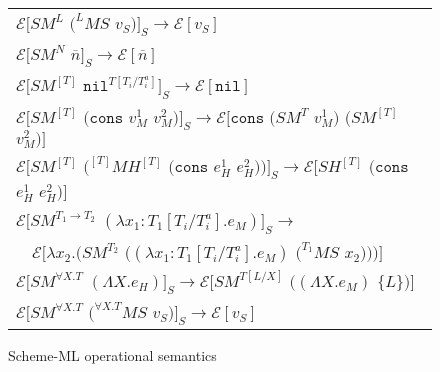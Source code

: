 \begin{figure}[p]
\centering
\begin{tabular}{l}
\vspace{5pt}

$\mathscr{E}[SM^{L}$ $(^{L}MS$ $v_{S})]_{S}\rightarrow\mathscr{E}[v_{S}]$ \\

\vspace{5pt}

$\mathscr{E}[SM^{N}$ $\overline{n}]_{S}\rightarrow\mathscr{E}[\overline{n}]$ \\

\vspace{5pt}

$\mathscr{E}[SM^{[T]}$ $\mathtt{nil}^{T[T_{i}/T_{i}^{a}]}]_{S}\rightarrow\mathscr{E}[\mathtt{nil}]$ \\

\vspace{5pt}

$\mathscr{E}[SM^{[T]}$ $(\mathtt{cons}$ $v_{M}^{1}$ $v_{M}^{2})]_{S}\rightarrow\mathscr{E}[\mathtt{cons}$ $(SM^{T}$ $v_{M}^{1})$ $(SM^{[T]}$ $v_{M}^{2})]$ \\

\vspace{5pt}

$\mathscr{E}[SM^{[T]}$ $(^{[T]}MH^{[T]}$ $(\mathtt{cons}$ $e_{H}^{1}$ $e_{H}^{2}))]_{S}\rightarrow\mathscr{E}[SH^{[T]}$ $(\mathtt{cons}$ $e_{H}^{1}$ $e_{H}^{2})]$ \\

\vspace{5pt}

$\mathscr{E}[SM^{T_{1}\rightarrow T_{2}}$ $(\lambda x_{1}:T_{1}[T_{i}/T_{i}^{a}].e_{M})]_{S}\rightarrow$ \\

\vspace{5pt}

$\quad\mathscr{E}[\lambda x_{2}.(SM^{T_{2}}$ $((\lambda x_{1}:T_{1}[T_{i}/T_{i}^{a}].e_{M})$ $(^{T_{1}}MS$ $x_{2})))]$ \\

\vspace{5pt}

$\mathscr{E}[SM^{\forall X.T}$ $(\Lambda X.e_{H})]_{S}\rightarrow\mathscr{E}[SM^{T[L/X]}$ $((\Lambda X.e_{M})$ $\lbrace L\rbrace)]$ \\

\vspace{5pt}

$\mathscr{E}[SM^{\forall X.T}$ $(^{\forall X.T}MS$ $v_{S})]_{S}\rightarrow\mathscr{E}[v_{S}]$
\end{tabular}
\caption{Scheme-ML operational semantics}
\label{isos}
\end{figure}